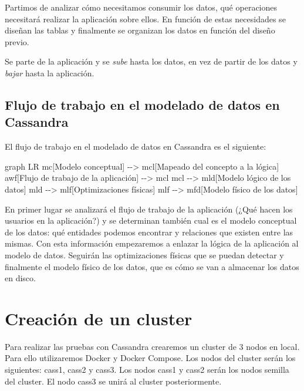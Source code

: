 \documentclass[
]{book}
\newenvironment{Shaded}{}{}
\newcommand{\NormalTok}[1]{#1}
\begin{document}
Partimos de analizar cómo necesitamos consumir los datos, qué operaciones necesitará realizar la aplicación sobre ellos. En función de estas necesidades se diseñan las tablas y finalmente se organizan los datos en función del diseño previo.

Se parte de la aplicación y se \emph{sube} hasta los datos, en vez de partir de los datos y \emph{bajar} hasta la aplicación.

\subsection{Flujo de trabajo en el modelado de datos en Cassandra}\label{flujo-de-trabajo-en-el-modelado-de-datos-en-cassandra}

El flujo de trabajo en el modelado de datos en Cassandra es el siguiente:

\begin{Shaded}
\begin{Highlighting}[]
\NormalTok{graph LR}
\NormalTok{mc[Modelo conceptual] {-}{-}\textgreater{} mcl[Mapeado del concepto}
\NormalTok{a la lógica]}
\NormalTok{awf[Flujo de trabajo}
\NormalTok{de la aplicación] {-}{-}\textgreater{} mcl}
\NormalTok{mcl {-}{-}\textgreater{} mld[Modelo lógico}
\NormalTok{de los datos]}
\NormalTok{mld {-}{-}\textgreater{} mlf[Optimizaciones }
\NormalTok{físicas]}
\NormalTok{mlf {-}{-}\textgreater{} mfd[Modelo físico}
\NormalTok{de los datos]}
\end{Highlighting}
\end{Shaded}

En primer lugar se analizará el flujo de trabajo de la aplicación (¿Qué hacen los usuarios en la aplicación?) y se determinan también cual es el modelo conceptual de los datos: qué entidades podemos encontrar y relaciones que existen entre las mismas. Con esta información empezaremos a enlazar la lógica de la aplicación al modelo de datos. Seguirán las optimizaciones físicas que se puedan detectar y finalmente el modelo físico de los datos, que es cómo se van a almacenar los datos en disco.

\section{Creación de un cluster}\label{creaciuxf3n-de-un-cluster}

Para realizar las pruebas con Cassandra crearemos un cluster de 3 nodos en local. Para ello utilizaremos Docker y Docker Compose. Los nodos del cluster serán los siguientes: cass1, cass2 y cass3. Los nodos cass1 y cass2 serán los nodos semilla del cluster. El nodo cass3 se unirá al cluster posteriormente.
\end{document}
